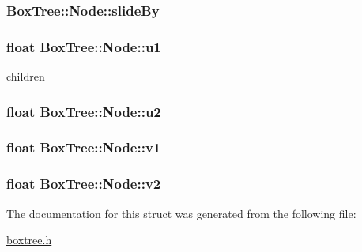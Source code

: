 \subsubsection[{\texorpdfstring{slide\+By}{slideBy}}]{ Box\+Tree\+::\+Node\+::slide\+By}\hypertarget{structBoxTree_1_1Node_a23938b7d422df4c0faebd8fe0af43bd3}{}\label{structBoxTree_1_1Node_a23938b7d422df4c0faebd8fe0af43bd3}
\subsubsection[{\texorpdfstring{u1}{u1}}]{\setlength{\rightskip}{0pt plus 5cm}float Box\+Tree\+::\+Node\+::u1}\hypertarget{structBoxTree_1_1Node_ab92350a00f11c1d1f7c7c076029bfa65}{}\label{structBoxTree_1_1Node_ab92350a00f11c1d1f7c7c076029bfa65}


children 

\subsubsection[{\texorpdfstring{u2}{u2}}]{\setlength{\rightskip}{0pt plus 5cm}float Box\+Tree\+::\+Node\+::u2}\hypertarget{structBoxTree_1_1Node_a5f00089be77fb8baf47bde296a491a5b}{}\label{structBoxTree_1_1Node_a5f00089be77fb8baf47bde296a491a5b}
\subsubsection[{\texorpdfstring{v1}{v1}}]{\setlength{\rightskip}{0pt plus 5cm}float Box\+Tree\+::\+Node\+::v1}\hypertarget{structBoxTree_1_1Node_a6776d4995a710d07a91c8ce29d6ca8e8}{}\label{structBoxTree_1_1Node_a6776d4995a710d07a91c8ce29d6ca8e8}
\subsubsection[{\texorpdfstring{v2}{v2}}]{\setlength{\rightskip}{0pt plus 5cm}float Box\+Tree\+::\+Node\+::v2}\hypertarget{structBoxTree_1_1Node_a00397c546d573ed0018f43b714414303}{}\label{structBoxTree_1_1Node_a00397c546d573ed0018f43b714414303}


The documentation for this struct was generated from the following file\+:\begin{DoxyCompactItemize}
\item 
\hyperlink{boxtree_8h}{boxtree.\+h}\end{DoxyCompactItemize}
